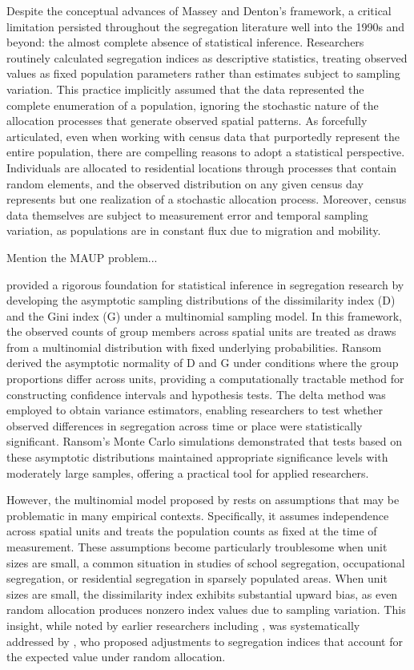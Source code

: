 \documentclass[12pt,a4paper]{article}
\begin{document}
Despite the conceptual advances of Massey and Denton's framework, a critical limitation persisted throughout the segregation literature well into the 1990s and beyond: the almost complete absence of statistical inference. Researchers routinely calculated segregation indices as descriptive statistics, treating observed values as fixed population parameters rather than estimates subject to sampling variation. This practice implicitly assumed that the data represented the complete enumeration of a population, ignoring the stochastic nature of the allocation processes that generate observed spatial patterns. As \cite{ransom2000sampling} forcefully articulated, even when working with census data that purportedly represent the entire population, there are compelling reasons to adopt a statistical perspective. Individuals are allocated to residential locations through processes that contain random elements, and the observed distribution on any given census day represents but one realization of a stochastic allocation process. Moreover, census data themselves are subject to measurement error and temporal sampling variation, as populations are in constant flux due to migration and mobility.

Mention the MAUP problem...

\cite{ransom2000sampling} provided a rigorous foundation for statistical inference in segregation research by developing the asymptotic sampling distributions of the dissimilarity index (D) and the Gini index (G) under a multinomial sampling model. In this framework, the observed counts of group members across spatial units are treated as draws from a multinomial distribution with fixed underlying probabilities. Ransom derived the asymptotic normality of D and G under conditions where the group proportions differ across units, providing a computationally tractable method for constructing confidence intervals and hypothesis tests. The delta method was employed to obtain variance estimators, enabling researchers to test whether observed differences in segregation across time or place were statistically significant. Ransom's Monte Carlo simulations demonstrated that tests based on these asymptotic distributions maintained appropriate significance levels with moderately large samples, offering a practical tool for applied researchers.

However, the multinomial model proposed by \cite{ransom2000sampling} rests on assumptions that may be problematic in many empirical contexts. Specifically, it assumes independence across spatial units and treats the population counts as fixed at the time of measurement. These assumptions become particularly troublesome when unit sizes are small, a common situation in studies of school segregation, occupational segregation, or residential segregation in sparsely populated areas. When unit sizes are small, the dissimilarity index exhibits substantial upward bias, as even random allocation produces nonzero index values due to sampling variation. This insight, while noted by earlier researchers including \cite{cortese1976further}, was systematically addressed by \cite{carrington1997measuring}, who proposed adjustments to segregation indices that account for the expected value under random allocation.
\end{document}
